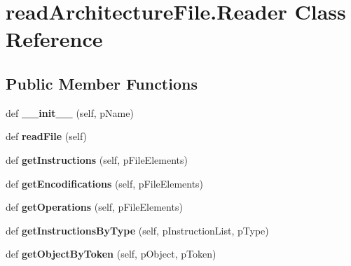 \hypertarget{classreadArchitectureFile_1_1Reader}{}\section{read\+Architecture\+File.\+Reader Class Reference}
\label{classreadArchitectureFile_1_1Reader}
\subsection*{Public Member Functions}
\begin{DoxyCompactItemize}
\item 
def {\bfseries \+\_\+\+\_\+init\+\_\+\+\_\+} (self, p\+Name)\hypertarget{classreadArchitectureFile_1_1Reader_a7c0c2a242a918c700225ea90f9d59994}{}\label{classreadArchitectureFile_1_1Reader_a7c0c2a242a918c700225ea90f9d59994}

\item 
def {\bfseries read\+File} (self)\hypertarget{classreadArchitectureFile_1_1Reader_a983f838a45dd63596308f5e1eae753c6}{}\label{classreadArchitectureFile_1_1Reader_a983f838a45dd63596308f5e1eae753c6}

\item 
def {\bfseries get\+Instructions} (self, p\+File\+Elements)\hypertarget{classreadArchitectureFile_1_1Reader_ab870227ebf1072de37e044a967f2b18f}{}\label{classreadArchitectureFile_1_1Reader_ab870227ebf1072de37e044a967f2b18f}

\item 
def {\bfseries get\+Encodifications} (self, p\+File\+Elements)\hypertarget{classreadArchitectureFile_1_1Reader_a6e87e42e9cc0258e9ca553b178c82b77}{}\label{classreadArchitectureFile_1_1Reader_a6e87e42e9cc0258e9ca553b178c82b77}

\item 
def {\bfseries get\+Operations} (self, p\+File\+Elements)\hypertarget{classreadArchitectureFile_1_1Reader_af149388fdcbe5140789f83ce3091100e}{}\label{classreadArchitectureFile_1_1Reader_af149388fdcbe5140789f83ce3091100e}

\item 
def {\bfseries get\+Instructions\+By\+Type} (self, p\+Instruction\+List, p\+Type)\hypertarget{classreadArchitectureFile_1_1Reader_a9d262a061da40d015761277bfc1e029c}{}\label{classreadArchitectureFile_1_1Reader_a9d262a061da40d015761277bfc1e029c}

\item 
def {\bfseries get\+Object\+By\+Token} (self, p\+Object, p\+Token)\hypertarget{classreadArchitectureFile_1_1Reader_a0b9945fbb5eb21547949afdd2d2517cd}{}\label{classreadArchitectureFile_1_1Reader_a0b9945fbb5eb21547949afdd2d2517cd}


\end{DoxyCompactItemize}
